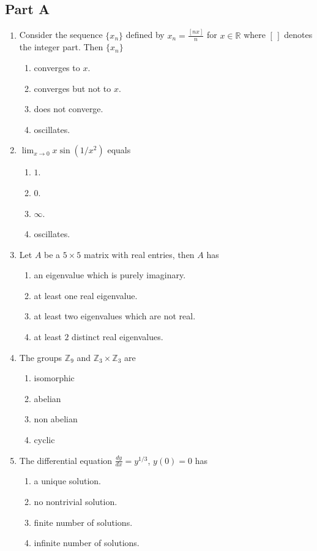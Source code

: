 \documentclass[11pt, a4paper]{article}
\begin{document}
\subsection*{Part A}
\begin{enumerate}
  \item Consider the sequence $\{x_n\}$ defined by $x_n = \frac{[nx]}{n}$ for $x \in \mathbb{R}$ where $[\,]$ denotes the integer part. Then $\{x_n\}$
  \begin{enumerate}[label=(\alph*)]
    \item converges to $x$.
    \item converges but not to $x$.
    \item does not converge.
    \item oscillates.
  \end{enumerate}

  \item $\displaystyle \lim_{x \to 0} x \sin(1/x^2)$ equals
  \begin{enumerate}[label=(\alph*)]
    \item $1$.
    \item $0$.
    \item $\infty$.
    \item oscillates.
  \end{enumerate}

  \item Let $A$ be a $5 \times 5$ matrix with real entries, then $A$ has
  \begin{enumerate}[label=(\alph*)]
    \item an eigenvalue which is purely imaginary.
    \item at least one real eigenvalue.
    \item at least two eigenvalues which are not real.
    \item at least $2$ distinct real eigenvalues.
  \end{enumerate}

  \item The groups $\mathbb{Z}_9$ and $\mathbb{Z}_3 \times \mathbb{Z}_3$ are
  \begin{enumerate}[label=(\alph*)]
    \item isomorphic
    \item abelian
    \item non abelian
    \item cyclic
  \end{enumerate}

  \item The differential equation $\displaystyle \frac{dy}{dx} = y^{1/3}$, $y(0) = 0$ has
  \begin{enumerate}[label=(\alph*)]
    \item a unique solution.
    \item no nontrivial solution.
    \item finite number of solutions.
    \item infinite number of solutions.
  \end{enumerate}


\end{enumerate}
\end{document}
